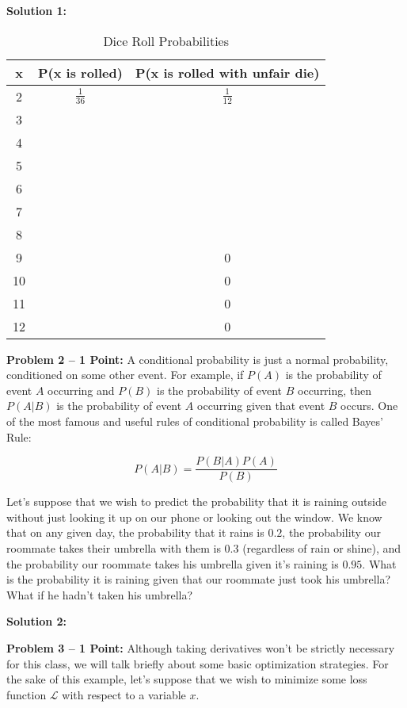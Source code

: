 \documentclass[]{article}
\begin{document}
\textbf{Solution 1:}
\bigskip
\begin{table}[htb]
\centering
    \begin{tabular}{|c|c|c|}
      \hline
      x & P(x is rolled) & P(x is rolled with unfair die) \\ \hline
      2 & $\frac{1}{36}$ & $\frac{1}{12}$ \\
      3 & & \\
      4 & & \\
      5 & & \\
      6 & & \\
      7 & & \\
      8 & & \\
      9 & & 0 \\
      10 & & 0 \\
      11 & & 0 \\
      12 & & 0 \\
      \hline
    \end{tabular}
    \caption{Dice Roll Probabilities}
    \label{tab:dice}
\end{table}
\clearpage

\textbf{Problem 2 -- 1 Point:}
A conditional probability is just a normal probability, conditioned on some other event.  For example, if $P(A)$ is the probability of event $A$ occurring and $P(B)$ is the probability of event $B$ occurring, then $P(A|B)$ is the probability of event $A$ occurring given that event $B$ occurs.  One of the most famous and useful rules of conditional probability is called Bayes' Rule:

$$P(A|B) = \frac{P(B|A)P(A)}{P(B)}$$

Let's suppose that we wish to predict the probability that it is raining outside without just looking it up on our phone or looking out the window.  We know that on any given day, the probability that it rains is $0.2$, the probability our roommate takes their umbrella with them is $0.3$ (regardless of rain or shine), and the probability our roommate takes his umbrella given it's raining is $0.95$.  What is the probability it is raining given that our roommate just took his umbrella?  What if he hadn't taken his umbrella?

\textbf{Solution 2:}

\clearpage

\textbf{Problem 3 -- 1 Point:}
Although taking derivatives won't be strictly necessary for this class, we will talk briefly about some basic optimization strategies.  For the sake of this example, let's suppose that we wish to minimize some loss function $\mathcal{L}$ with respect to a variable $x$.  
\end{document}
